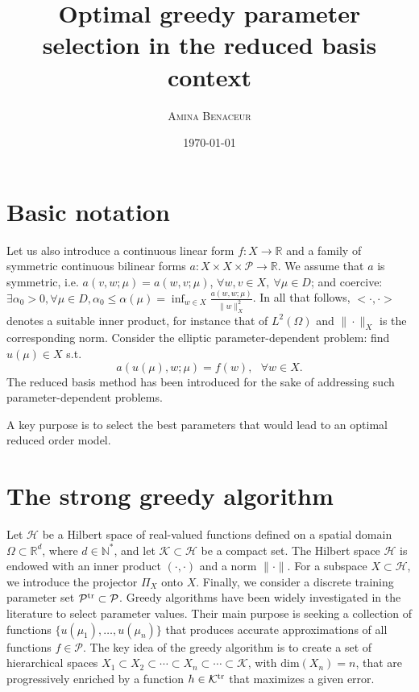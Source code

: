 \documentclass[12pt,a4paper]{article}
\title{ \bfseries \Huge {Optimal greedy parameter selection in the reduced basis context}}
\author{  \scshape  Amina Benaceur }
\date{\today}
\newcommand{\Ptr}{\mathcal P^{\rm tr}}
\newcommand{\N}{\mathbb N}
\newcommand{\calK}{\mathcal K}
\newcommand{\calH}{\mathcal H}
\newcommand{\calP}{\mathcal P}
\newcommand{\R}{\mathbb R}
\newcommand{\Ktr}{\calK^{\rm tr}}
\begin{document}
\maketitle
\section{Basic notation}
Let us also introduce a continuous linear form $ f: X\rightarrow \mathbb{R}$ and a family of symmetric continuous bilinear forms  
$ a: X\times X \times \mathcal P  \rightarrow \mathbb{R}$. We assume that $a$ is symmetric, i.e.
$a(v,w;\mu)=a(w,v;\mu)$, $\forall w,v \in X,\ \forall \mu \in D$; and coercive:
$\exists \alpha_{0}>0, \forall \mu \in D, \alpha_{0} \leq \alpha(\mu) = \inf_{w \in X}
\frac{a(w,w;\mu)}{\|w\|^{2}_{X}}$.
In all that follows, $<\cdot,\cdot>$ denotes a suitable inner product, for instance that of $ L^2(\Omega)$
and $\|\cdot\|_X$ is the corresponding norm. 
Consider the elliptic parameter-dependent problem: find $u(\mu) \in X$ s.t.
\begin{equation}\label{pde}
a(u(\mu),w;\mu) = f(w),\ \ \ \forall w \in X.
\end{equation}
The reduced basis method has been introduced for the sake of addressing such parameter-dependent problems.

A key purpose is to select the best parameters that would lead 
to an optimal reduced order model.

\section{The strong greedy algorithm}
Let $\calH$ be a Hilbert space of real-valued functions defined on a spatial domain $\Omega \subset \R^d$, where $d\in \N^*$, and let $\calK\subset\calH$ be a compact set. The Hilbert space $\calH$ is endowed with an inner product $(\cdot,\cdot)$ and a norm $\|\cdot\|$. For a subspace $X\subset\calH$, we introduce the projector $\Pi_X$ onto $X$.
Finally, we consider a discrete training parameter set $\Ptr\subset\calP$. Greedy algorithms have been widely investigated in the literature to select parameter values.
Their main purpose is seeking a collection of functions $\{u(\mu_1),\ldots,u(\mu_n)\}$ that produces accurate approximations of all functions $f\in\calP$. The key idea of the greedy algorithm is to create a set of hierarchical spaces
$X_1\subset X_2\subset\cdots\subset X_n\subset\cdots\subset \calK$, with $\mathrm{dim}(X_n) = n$, that are progressively enriched by a function $h\in\Ktr$ that maximizes a given error.
\end{document}
